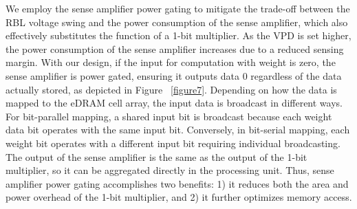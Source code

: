 We employ the sense amplifier power gating to mitigate the trade-off between the RBL voltage swing and the power consumption of the sense amplifier, which also effectively substitutes the function of a 1-bit multiplier. As the VPD is set higher, the power consumption of the sense amplifier increases due to a reduced sensing margin. With our design, if the input for computation with weight is zero, the sense amplifier is power gated, ensuring it outputs data 0 regardless of the data actually stored, as depicted in Figure ~\ref{figure7}. Depending on how the data is mapped to the eDRAM cell array, the input data is broadcast in different ways. For bit-parallel mapping, a shared input bit is broadcast because each weight data bit operates with the same input bit. Conversely, in bit-serial mapping, each weight bit operates with a different input bit requiring individual broadcasting. The output of the sense amplifier is the same as the output of the 1-bit multiplier, so it can be aggregated directly in the processing unit. Thus, sense amplifier power gating accomplishes two benefits: 1) it reduces both the area and power overhead of the 1-bit multiplier, and 2) it further optimizes memory access.


